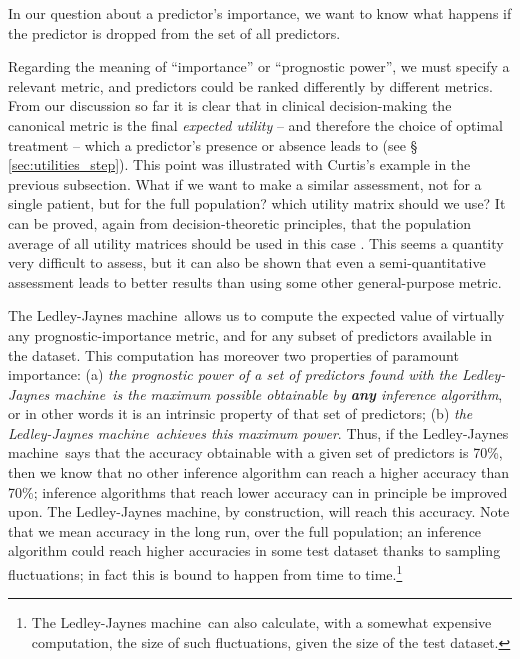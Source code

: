 \documentclass[utf8]{FrontiersinHarvard_mod} %
\newcommand*{\sect}{\S}%
\newcommand*{\cf}{{cf.}}
\renewcommand*{\|}[1][]{\nonscript\:#1\vert\nonscript\:\mathopen{}}
\newcommand*{\ljm}{Ledley-Jaynes machine}
\begin{document}
In our question about a predictor's importance, we want to know what happens if the predictor is dropped from the set of all predictors.

Regarding the meaning of \enquote{importance} or \enquote{prognostic power}, we must specify a relevant metric, and predictors could be ranked differently by different metrics. From our discussion so far it is clear that in clinical decision-making the canonical metric is the final \emph{expected utility} -- and therefore the choice of optimal treatment -- which a predictor's presence or absence leads to (see \sect\,\ref{sec:utilities_step}). This point was illustrated with Curtis's example in the previous subsection. What if we want to make a similar assessment, not for a single patient, but for the full population? which utility matrix should we use? It can be proved, again from decision-theoretic principles, that the population average of all utility matrices should be used in this case \citep[\cf][\sect\,4.1]{dyrlandetal2022}. This seems a quantity very difficult to assess, but it can also be shown \citep[\sect\,4.2]{dyrlandetal2022} that even a semi-quantitative assessment leads to better results than using some other general-purpose metric.

The \ljm\ allows us to compute the expected value of virtually any prognostic-importance metric, and for any subset of predictors available in the dataset. This computation has moreover two properties of paramount importance: (a) \emph{the prognostic power of a set of predictors found with the \ljm\ is the maximum possible obtainable by \textbf{any} inference algorithm}, or in other words it is an intrinsic property of that set of predictors; (b) \emph{the \ljm\ achieves this maximum power}. Thus, if the \ljm\ says that the accuracy obtainable with a given set of predictors is 70\%, then we know that no other inference algorithm can reach a higher accuracy than 70\%; inference algorithms that reach lower accuracy can in principle be improved upon. The \ljm, by construction, will reach this accuracy. Note that we mean accuracy in the long run, over the full population; an inference algorithm could reach higher accuracies in some test dataset thanks to sampling fluctuations; in fact this is bound to happen from time to time.\footnote{The \ljm\ can also calculate, with a somewhat expensive computation, the size of such fluctuations, given the size of the test dataset.}
\end{document}
